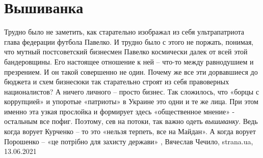  
 
 
 
 
\chapter{Вышиванка}

Трудно было не заметить, как старательно изображал из себя ультрапатриота глава
федерации футбола Павелко. И трудно было с этого не поржать, понимая, что
мутный постсоветский бизнесмен Павелко космически далек от всей этой
бандеровщины. Его настоящее отношение к ней – что-то между равнодушием и
презрением.  И он такой совершенно не один. Почему же все эти дорвавшиеся до
бюджета и схем бизнесюки так старательно строят из себя правоверных
националистов? А ничего личного – просто бизнес. Так сложилось, что «борцы с
коррупцией» и упоротые «патриоты» в Украине это одни и те же лица. При этом
именно эта узкая прослойка и формирует здесь «общественное мнение» - остальным
все пофиг.  Поэтому, сев на потоки, так важно одеть \emph{вышиванку}. Ведь когда
ворует Курченко – то это «нельзя терпеть, все на Майдан». А когда ворует
Порошенко – «це потрібно для захисту держави»
,
Вячеслав Чечило, strana.ua, 13.06.2021


